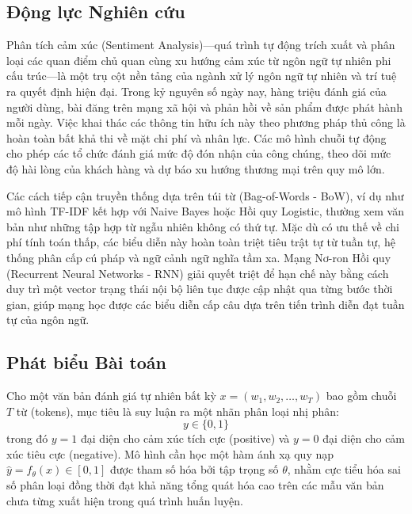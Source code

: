 \documentclass[11pt,a4paper]{article}
\begin{document}
\subsection{Động lực Nghiên cứu}
Phân tích cảm xúc (Sentiment Analysis)—quá trình tự động trích xuất và phân loại các quan điểm chủ quan cùng xu hướng cảm xúc từ ngôn ngữ tự nhiên phi cấu trúc—là một trụ cột nền tảng của ngành xử lý ngôn ngữ tự nhiên và trí tuệ ra quyết định hiện đại. Trong kỷ nguyên số ngày nay, hàng triệu đánh giá của người dùng, bài đăng trên mạng xã hội và phản hồi về sản phẩm được phát hành mỗi ngày. Việc khai thác các thông tin hữu ích này theo phương pháp thủ công là hoàn toàn bất khả thi về mặt chi phí và nhân lực. Các mô hình chuỗi tự động cho phép các tổ chức đánh giá mức độ đón nhận của công chúng, theo dõi mức độ hài lòng của khách hàng và dự báo xu hướng thương mại trên quy mô lớn.

Các cách tiếp cận truyền thống dựa trên túi từ (Bag-of-Words - BoW), ví dụ như mô hình TF-IDF kết hợp với Naive Bayes hoặc Hồi quy Logistic, thường xem văn bản như những tập hợp từ ngẫu nhiên không có thứ tự. Mặc dù có ưu thế về chi phí tính toán thấp, các biểu diễn này hoàn toàn triệt tiêu trật tự từ tuần tự, hệ thống phân cấp cú pháp và ngữ cảnh ngữ nghĩa tầm xa. Mạng Nơ-ron Hồi quy (Recurrent Neural Networks - RNN) giải quyết triệt để hạn chế này bằng cách duy trì một vector trạng thái nội bộ liên tục được cập nhật qua từng bước thời gian, giúp mạng học được các biểu diễn cấp câu dựa trên tiến trình diễn đạt tuần tự của ngôn ngữ.

\subsection{Phát biểu Bài toán}
Cho một văn bản đánh giá tự nhiên bất kỳ $x = (w_1, w_2, \dots, w_T)$ bao gồm chuỗi $T$ từ (tokens), mục tiêu là suy luận ra một nhãn phân loại nhị phân:
\begin{equation}
y \in \{0, 1\}
\end{equation}
trong đó $y = 1$ đại diện cho cảm xúc tích cực (positive) và $y = 0$ đại diện cho cảm xúc tiêu cực (negative). Mô hình cần học một hàm ánh xạ quy nạp $\hat{y} = f_\theta(x) \in [0, 1]$ được tham số hóa bởi tập trọng số $\theta$, nhằm cực tiểu hóa sai số phân loại đồng thời đạt khả năng tổng quát hóa cao trên các mẫu văn bản chưa từng xuất hiện trong quá trình huấn luyện.
\end{document}
